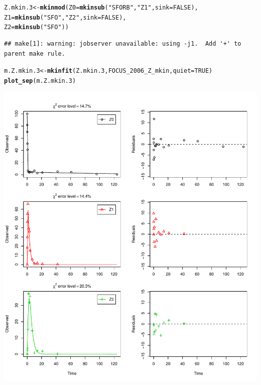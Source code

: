 \documentclass[12pt,a4paper]{article}\usepackage[]{graphicx}\usepackage[]{color}
\makeatletter
\def\maxwidth{ %
  \ifdim\Gin@nat@width>\linewidth
    \linewidth
  \else
    \Gin@nat@width
  \fi
}
\newcommand{\hlnum}[1]{\textcolor[rgb]{0.686,0.059,0.569}{#1}}%
\newcommand{\hlstr}[1]{\textcolor[rgb]{0.192,0.494,0.8}{#1}}%
\newcommand{\hlstd}[1]{\textcolor[rgb]{0.345,0.345,0.345}{#1}}%
\newcommand{\hlkwb}[1]{\textcolor[rgb]{0.69,0.353,0.396}{#1}}%
\newcommand{\hlkwc}[1]{\textcolor[rgb]{0.333,0.667,0.333}{#1}}%
\newcommand{\hlkwd}[1]{\textcolor[rgb]{0.737,0.353,0.396}{\textbf{#1}}}%
\newenvironment{kframe}{%
 \def\at@end@of@kframe{}%
 \ifinner\ifhmode%
  \def\at@end@of@kframe{\end{minipage}}%
  \begin{minipage}{\columnwidth}%
 \fi\fi%
 \def\FrameCommand##1{\hskip\@totalleftmargin \hskip-\fboxsep
 \colorbox{shadecolor}{##1}\hskip-\fboxsep
     \hskip-\linewidth \hskip-\@totalleftmargin \hskip\columnwidth}%
 \MakeFramed {\advance\hsize-\width
   \@totalleftmargin\z@ \linewidth\hsize
   \@setminipage}}%
 {\par\unskip\endMakeFramed%
 \at@end@of@kframe}
\newenvironment{knitrout}{}{} %
\makeatother
\begin{document}
\begin{knitrout}
\color{fgcolor}\begin{kframe}
\begin{alltt}
\hlstd{Z.mkin.3} \hlkwb{<-} \hlkwd{mkinmod}\hlstd{(}\hlkwc{Z0} \hlstd{=} \hlkwd{mkinsub}\hlstd{(}\hlstr{"SFORB"}\hlstd{,} \hlstr{"Z1"}\hlstd{,} \hlkwc{sink} \hlstd{=} \hlnum{FALSE}\hlstd{),}
                    \hlkwc{Z1} \hlstd{=} \hlkwd{mkinsub}\hlstd{(}\hlstr{"SFO"}\hlstd{,} \hlstr{"Z2"}\hlstd{,} \hlkwc{sink} \hlstd{=} \hlnum{FALSE}\hlstd{),}
                    \hlkwc{Z2} \hlstd{=} \hlkwd{mkinsub}\hlstd{(}\hlstr{"SFO"}\hlstd{))}
\end{alltt}
\begin{verbatim}
## make[1]: warning: jobserver unavailable: using -j1.  Add '+' to parent make rule.
\end{verbatim}


{\ttfamily\noindent\itshape\color{messagecolor}{\#\# Successfully compiled differential equation model from auto-generated C code.}}\begin{alltt}
\hlstd{m.Z.mkin.3} \hlkwb{<-} \hlkwd{mkinfit}\hlstd{(Z.mkin.3, FOCUS_2006_Z_mkin,} \hlkwc{quiet} \hlstd{=} \hlnum{TRUE}\hlstd{)}
\hlkwd{plot_sep}\hlstd{(m.Z.mkin.3)}
\end{alltt}
\end{kframe}
\includegraphics[width=\maxwidth]{figure/FOCUS_2006_Z_fits_9-1} 

\end{knitrout}
\end{document}
